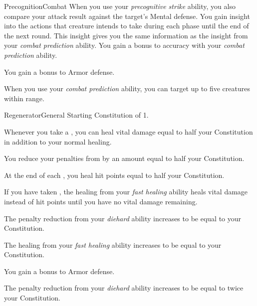 \begin{feat}{Precognition}{Combat}
         When you use your \textit{precognitive strike} ability, you also compare your attack result against the target's Mental defense.
        \hit You gain insight into the actions that creature intends to take during each phase until the end of the next round.
        This insight gives you the same information as the insight from your \textit{combat prediction} ability.
        You gain a  bonus to accuracy with your \textit{combat prediction} ability.

         You gain a  bonus to Armor defense. 

         When you use your \textit{combat prediction} ability, you can target up to five creatures within range.
    \end{feat}

    \begin{feat}{Regenerator}{General}
        \featpre Starting Constitution of 1.

         Whenever you take a , you can heal vital damage equal to half your Constitution in addition to your normal healing.

         You reduce your penalties from  by an amount equal to half your Constitution.

         At the end of each , you heal hit points equal to half your Constitution.

         If you have taken , the healing from your \textit{fast healing} ability heals vital damage instead of hit points until you have no vital damage remaining.

         The penalty reduction from your \textit{diehard} ability increases to be equal to your Constitution.

         The healing from your \textit{fast healing} ability increases to be equal to your Constitution.

         You gain a  bonus to Armor defense.

         The penalty reduction from your \textit{diehard} ability increases to be equal to twice your Constitution.
    \end{feat}

